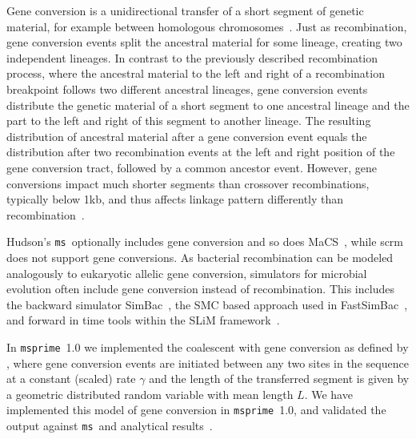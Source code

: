 \documentclass{article}
\newcommand{\msprime}[0]{\texttt{msprime}}
\newcommand{\ms}[0]{\texttt{ms}}
\begin{document}
Gene conversion is a unidirectional transfer of a short segment of genetic material,
for example between homologous chromosomes~\citep{chen2007gene}.
Just as recombination, gene conversion events split the ancestral material
for some lineage, creating two independent lineages.
In contrast to the previously described recombination process, where the ancestral
material to the left and right of a recombination breakpoint follows two
different ancestral lineages, gene conversion events distribute the genetic material
of a short segment to one ancestral lineage and the part to the left and right of this
segment to another lineage.
The resulting distribution of ancestral material after a gene conversion event
equals the distribution after two recombination events at the left and right position
of the gene conversion tract, followed by a common ancestor event.
However, gene conversions impact much shorter segments than crossover recombinations,
typically below 1kb, and thus affects linkage pattern differently than
recombination~\citep{korunes2017gene}.

Hudson's \ms\ optionally includes gene conversion and so does
MaCS~\citep{chen2009fast}, while scrm~\citep{staab2015scrm} does not
support gene conversions.
As bacterial recombination can be modeled analogously to eukaryotic allelic
gene conversion, simulators for microbial evolution often include gene conversion
instead of recombination.
This includes the backward simulator SimBac~\citep{brown2016simbac},
the SMC based approach used in FastSimBac~\citep{demaio2017the},
and forward in time tools within the SLiM framework~\citep{cury2020simulation}.

In \msprime\ 1.0 we implemented the coalescent with gene conversion as defined by
\cite{wiuf2000coalescent}, where gene conversion events are initiated between any
two sites in the sequence at a constant (scaled) rate $\gamma$ and
the length of the transferred segment is given by a geometric distributed
random variable with mean length $L$.
We have implemented this model of gene
conversion in \msprime\ 1.0, and validated the output against
\ms\ and analytical results~\citep{wiuf2000coalescent}.
\end{document}
